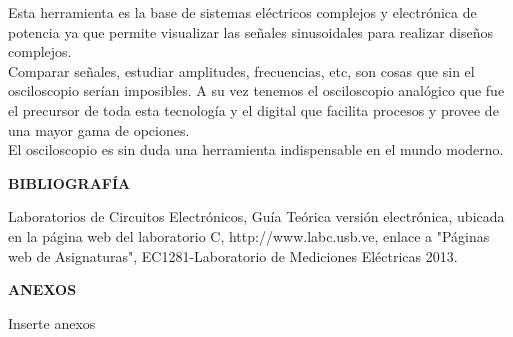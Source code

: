 \documentclass[12pt]{article}
\begin{document}
\begin{enumerate}
		\noindent Esta herramienta es la base de sistemas eléctricos complejos y electrónica de potencia ya que permite visualizar las señales sinusoidales para realizar diseños complejos.\\
		
		\noindent Comparar señales, estudiar amplitudes, frecuencias, etc, son cosas que sin el osciloscopio serían imposibles. A su vez tenemos el osciloscopio analógico que fue el precursor de toda esta tecnología y el digital que facilita procesos y provee de una mayor gama de opciones.\\
		
		\noindent El osciloscopio es sin duda una herramienta indispensable en el mundo moderno.
		
	\end{enumerate}
	
	\newpage
	
	\begin{center}
		\textbf{\large BIBLIOGRAFÍA}\\
	\end{center}
	
	\noindent Laboratorios de Circuitos Electrónicos, Guía Teórica versión electrónica, ubicada en la página web del laboratorio C, http://www.labc.usb.ve, enlace a "Páginas web de Asignaturas", EC1281-Laboratorio de Mediciones Eléctricas 2013.
	
	\newpage
	
	\begin{center}
		\textbf{\large ANEXOS}\\
	\end{center}
	
	Inserte anexos
	
\end{document}
